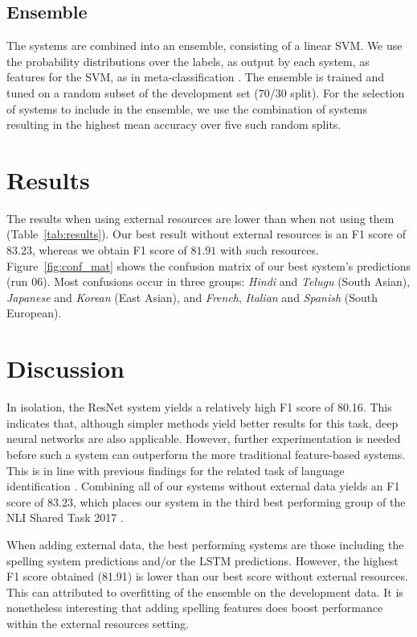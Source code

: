 \documentclass[11pt,letterpaper]{article}
\begin{document}
\subsection{Ensemble}
The systems are combined into an ensemble, consisting of a linear SVM.
We use the probability distributions over the labels, as output by each system, as features for the SVM, as in meta-classification \citep{malmasi:2017:nlisg}.
The ensemble is trained and tuned on a random subset of the development set ($70/30$ split).
For the selection of systems to include in the ensemble, we use the combination of systems resulting in the highest mean accuracy over five such random splits.


\section{Results}
The results when using external resources are lower than when not using them (Table~\ref{tab:results}).
Our best result without external resources is an F1 score of $83.23$, whereas we obtain F1 score of $81.91$ with such resources.
Figure~\ref{fig:conf_mat} shows the confusion matrix of our best system's predictions (run 06).
Most confusions occur in three groups: \textit{Hindi} and \textit{Telugu} (South Asian), \textit{Japanese} and \textit{Korean} (East Asian), and \textit{French}, \textit{Italian} and \textit{Spanish} (South European).


\section{Discussion}

In isolation, the ResNet system yields a relatively high F1 score of 80.16.
This indicates that, although simpler methods yield better results for this task, deep neural networks are also applicable.
However, further experimentation is needed before such a system can outperform the more traditional feature-based systems.
This is in line with previous findings for the related task of language identification \citep{medvedeva:2017,vardial2017}.
Combining all of our systems without external data yields an F1 score of 83.23, which places our system in the third best performing group of the NLI Shared Task 2017 \citep{nli2017}.

When adding external data, the best performing systems are those including the spelling system predictions and/or the LSTM predictions.
However, the highest F1 score obtained (81.91) is lower than our best score without external resources.
This can attributed to overfitting of the ensemble on the development data.
It is nonetheless interesting that adding spelling features does boost performance within the external resources setting.
\end{document}
